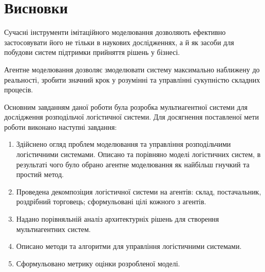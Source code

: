 \section*{Висновки}
Сучасні інструменти імітаційного моделювання дозволяють ефективно застосовувати його
не тільки в наукових дослідженнях, а й як засоби для побудови систем підтримки прийняття рішень у бізнесі. 

Агентне моделювання дозволяє змоделювати систему максимально наближену до реальності, зробити значний крок у розумінні та управлінні сукупністю складних процесів.

Основним завданням даної роботи була розробка мультиагентної системи для дослідження розподільчої логістичної системи.
Для досягнення поставленої мети роботи виконано наступні завдання:
\begin{enumerate}
    \item Здійснено огляд проблем моделювання та управління розподільчими логістичними системами. Описано та порівняно моделі логістичних систем, в результаті чого було обрано агентне моделювання як найбільш гнучкий та простий метод.
    \item Проведена декомпозіция логістичної системи на агентів: склад, постачальник, роздрібний торговець; сформульовані цілі кожного з агентів.
    \item Надано порівняльній аналіз архитектурніх рішень для створення мультиагентних систем.
	\item Описано методи та алгоритми для управління логістичними системами.
	\item Сформульовано метрику оцінки розробленої моделі.  
\end{enumerate}

